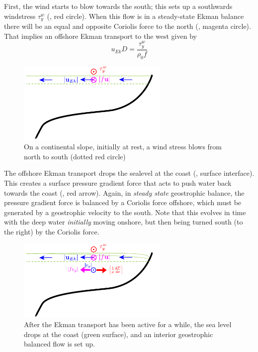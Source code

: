 First, the wind starts to blow towards the south; this sets up a southwards windstress $\tau_y^w$ (, red circle).  When this flow is in a steady-state Ekman balance there will be an equal and opposite Coriolis force to the north (, magenta circle).  That implies an offshore Ekman transport to the west given by 
\begin{equation}
  u_{Ek}D = \frac{\tau_y^w}{\rho_0 f}
\end{equation}


\begin{figure}[hbt]
  \begin{center}
    \includegraphics[width=2.85in]{figs/Geostrophic/CoastalStep1}
    \caption{On a continental slope, initially at rest, a wind stress blows from north to south (dotted red circle)}
    \label{fig:CoastalStep1}  
  \end{center}
\end{figure}

The offshore Ekman transport drops the sealevel at the coast (, surface interface).   This creates a surface pressure gradient force that acts to push water back towards the coast (, red arrow).  Again, in \emph{steady state} geostrophic balance, the pressure gradient force is balanced by a Coriolis force offshore, which must be generated by a geostrophic velocity to the south.  Note that this evolves in time with the deep water \emph{initially} moving onshore, but then being turned south (to the right) by the Coriolis force.  

\begin{figure}[hbt]
  \begin{center}
    \includegraphics[width=2.85in]{figs/Geostrophic/CoastalStep2}
    \caption{After the Ekman transport has been active for a while, the sea level drops at the coast (green surface), and an interior geostrophic balanced flow is set up.}
    \label{fig:CoastalStep2}  
  \end{center}
\end{figure}

